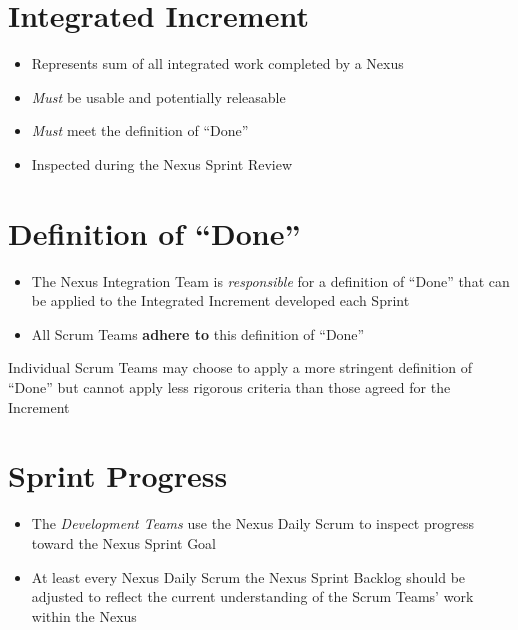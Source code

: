 \documentclass[a4paper,11pt,twocolumn]{article}
\begin{document}
\section*{Integrated Increment}
\begin{itemize}
	\item Represents sum of all integrated work completed by a Nexus
	\item \textit{Must} be usable and potentially releasable
	\item \textit{Must} meet the definition of ``Done''
	\item Inspected during the Nexus Sprint Review
\end{itemize}

\section*{Definition of ``Done''}
\begin{itemize}
	\item The Nexus Integration Team is \textit{responsible} for a definition of ``Done'' that can be applied to the Integrated Increment developed each Sprint
	\item All Scrum Teams \textbf{adhere to} this definition of ``Done''
\end{itemize}

\begin{tcolorbox}[colback=black!8!white,colframe=gray!50!black,title=Note,sharp corners,fonttitle=\normalsize\bfseries,fontupper=\normalsize]
	Individual Scrum Teams may choose to apply a more stringent definition of ``Done'' but cannot apply less rigorous criteria than those agreed for the Increment
\end{tcolorbox}

\section*{Sprint Progress}
\begin{itemize}
	\item The \textit{Development Teams} use the Nexus Daily Scrum to inspect progress toward the Nexus Sprint Goal
	\item At least every Nexus Daily Scrum the Nexus Sprint Backlog should be adjusted to reflect the current understanding of the Scrum Teams' work within the Nexus
\end{itemize}

\nocite{*}


\end{document}
